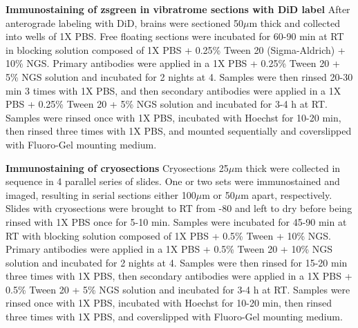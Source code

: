 \noindent\textbf{Immunostaining of zsgreen in vibratrome sections with DiD label} \newline
\indent After anterograde labeling with DiD, brains were sectioned 50$\mu$m thick and collected into wells of 1X PBS.
Free floating sections were incubated for 60-90 min at RT in blocking solution composed of 1X PBS + 0.25\% Tween 20 (Sigma-Aldrich) + 10\% NGS.
Primary antibodies were applied in a 1X PBS + 0.25\% Tween 20 + 5\% NGS solution and incubated for 2 nights at 4\textcelsius.
Samples were then rinsed 20-30 min 3 times with 1X PBS, and then secondary antibodies were applied in a 1X PBS + 0.25\% Tween 20 + 5\% NGS solution and incubated for 3-4 h at RT.
Samples were rinsed once with 1X PBS, incubated with Hoechst for 10-20 min, then rinsed three times with 1X PBS, and mounted sequentially and coverslipped with Fluoro-Gel mounting medium.

\noindent\textbf{Immunostaining of cryosections} \newline
\indent Cryosections 25$\mu$m thick were collected in sequence in 4 parallel series of slides.
One or two sets were immunostained and imaged, resulting in serial sections either 100$\mu$m or 50$\mu$m apart, respectively.
Slides with cryosections were brought to RT from -80\textcelsius{} and left to dry before being rinsed with 1X PBS once for 5-10 min.
Samples were incubated for 45-90 min at RT with blocking solution composed of 1X PBS + 0.5\% Tween + 10\% NGS.
Primary antibodies were applied in a 1X PBS + 0.5\% Tween 20 + 10\% NGS solution and incubated for 2 nights at 4\textcelsius.
Samples were then rinsed for 15-20 min three times with 1X PBS, then secondary antibodies were applied in a 1X PBS + 0.5\% Tween 20 + 5\% NGS solution and incubated for 3-4 h at RT.
Samples were rinsed once with 1X PBS, incubated with Hoechst for 10-20 min, then rinsed three times with 1X PBS, and coverslipped with Fluoro-Gel mounting medium.